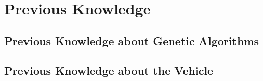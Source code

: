 \chapter{Previous Knowledge}
\label{cha:previous_knowledge}



\section{Previous Knowledge about Genetic Algorithms} %
\label{sec:previous_knowledge_ga}



\section{Previous Knowledge about the Vehicle} %
\label{sec:previous_knowledge_vehicle}
